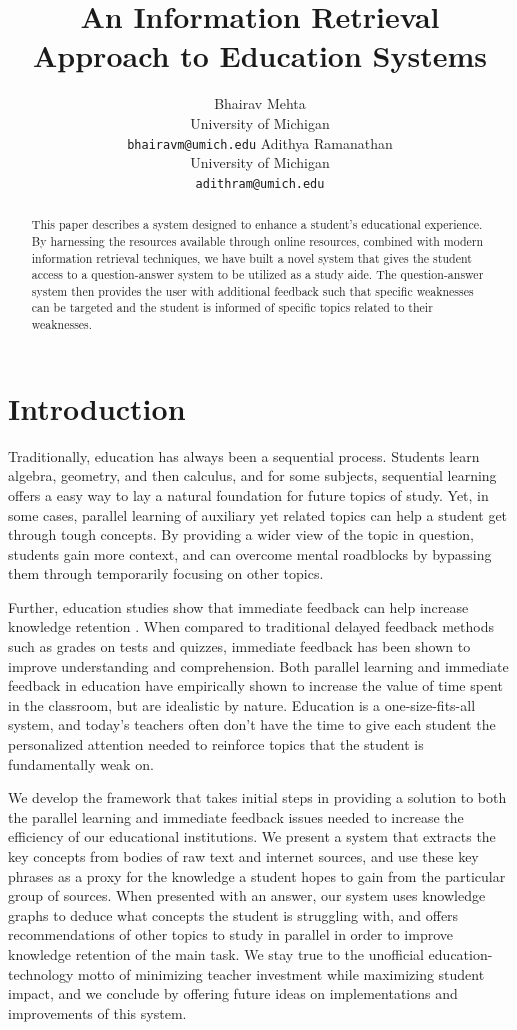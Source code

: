 \documentclass[11pt,a4paper]{article}
\title{An Information Retrieval Approach to Education Systems}
\author{Bhairav Mehta \\
  University of Michigan \\
  {\tt bhairavm@umich.edu}
  \And
  Adithya Ramanathan \\
  University of Michigan \\
  {\tt adithram@umich.edu}}
\date{}
\begin{document}
\maketitle
\begin{abstract}
  This paper describes a system designed to enhance a student’s educational experience. By harnessing the resources available through online resources, combined with modern information retrieval techniques, we have built a novel system that gives the student access to a question-answer system to be utilized as a study aide. The question-answer system then provides the user with additional feedback such that specific weaknesses can be targeted and the student is informed of specific topics related to their weaknesses. 
\end{abstract}

\section{Introduction}

Traditionally, education has always been a sequential process. Students learn algebra, geometry, and then calculus, and for some subjects, sequential learning offers a easy way to lay a natural foundation for future topics of study. Yet, in some cases, parallel learning of auxiliary yet related topics can help a student get through tough concepts. By providing a wider view of the topic in question, students gain more context, and can overcome mental roadblocks by bypassing them through temporarily focusing on other topics.

Further, education studies show that immediate feedback can help increase knowledge retention \cite{samuels_wu}. When compared to traditional delayed feedback methods such as grades on tests and quizzes, immediate feedback has been shown to improve understanding and comprehension. Both parallel learning and immediate feedback in education have empirically shown to increase the value of time spent in the classroom, but are idealistic by nature. Education is a one-size-fits-all system, and today’s teachers often don’t have the time to give each student the personalized attention needed to reinforce topics that the student is fundamentally weak on. 

We develop the framework that takes initial steps in providing a solution to both the parallel learning and immediate feedback issues needed to increase the efficiency of our educational institutions. We present a system that extracts the key concepts from bodies of raw text and internet sources, and use these key phrases as a proxy for the knowledge a student hopes to gain from the particular group of sources. When presented with an answer, our system uses knowledge graphs to deduce what concepts the student is struggling with, and offers recommendations of other topics to study in parallel in order to improve knowledge retention of the main task. We stay true to the unofficial education-technology motto of minimizing teacher investment while maximizing student impact, and we conclude by offering future ideas on implementations and improvements of this system.
\end{document}

